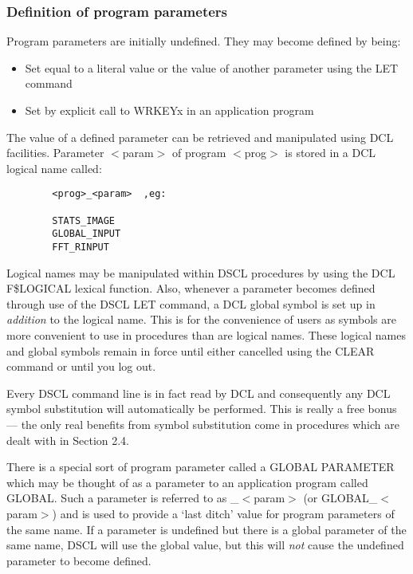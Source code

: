 \subsubsection {Definition of program parameters}
Program parameters are initially undefined.
They may become defined by being:
\begin{itemize}
\item Set equal to a literal value or the value of another parameter using the
LET command
\item Set by explicit call to WRKEYx in an application program
\end{itemize}
The value of a defined parameter can be retrieved and manipulated using DCL
facilities.
Parameter $<$param$>$ of program $<$prog$>$ is stored in a DCL logical name called:
\begin{verbatim}
        <prog>_<param>  ,eg:

        STATS_IMAGE
        GLOBAL_INPUT
        FFT_RINPUT
\end{verbatim}
Logical names may be manipulated within DSCL procedures by using the DCL
F\$LOGICAL lexical function.
Also, whenever a parameter becomes defined through use of the DSCL LET command,
a DCL global symbol is set up in {\em addition} to the logical name.
This is for the convenience of users as symbols are more convenient to use in
procedures than are logical names.
These logical names and global symbols remain in force until either cancelled
using the CLEAR command or until you log out.

Every DSCL command line is in fact read by DCL and consequently any DCL symbol
substitution will automatically be performed.
This is really a free bonus --- the only real benefits from symbol substitution
come in procedures which are dealt with in Section 2.4.

There is a special sort of program parameter called a GLOBAL PARAMETER which
may be thought of as a parameter to an application program called GLOBAL.
Such a parameter is referred to as  \_$<$param$>$ (or GLOBAL\_$<$param$>$) and is used
to provide a `last ditch' value for program parameters of the same name.
If a parameter is undefined but there is a global parameter of the same name,
DSCL will use the global value, but this will {\em not} cause the undefined
parameter to become defined.
